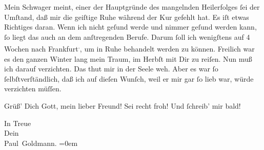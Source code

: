 \pstart
           {\pb}Mein Schwager meint, einer der Hauptgründe des mangelnden
               Heilerfolges ſei der Umſtand, daß mir die geiſtige Ruhe während der Kur gefehlt hat.
               Es iſt etwas Richtiges daran. Wenn ich nicht geſund werde und nimmer geſund werden
               kann, ſo liegt das auch an dem anſtregenden Berufe. Darum ſoll ich wenigſtens auf 4
               Wochen nach Frankfurt\substVorne{}\textsuperscript{.}\substDazwischen{},\substHinten{} um in Ruhe behandelt werden zu können. Freilich war es den ganzen Winter
               lang mein Traum, im Herbſt mit Dir zu reiſen. Nun muß ich darauf verzichten. Das thut
               mir in der Seele {\pb}weh. Aber es war ſo
               ſelbſtverſtändlich, daß ich auf dieſen Wunſch, weil er mir gar ſo lieb war, würde
               verzichten müſſen.\pend
           
\pstart
           Grüß’ Dich Gott, mein lieber Freund! Sei recht froh! Und ſchreib’ mir bald!\pend
           
\pstart
           In Treue {\\[\baselineskip]}Dein {\\[\baselineskip]}\spacefill\mbox{Paul Goldmann.}\pend
           \leftskip=0em{}\endnumbering{}  
      